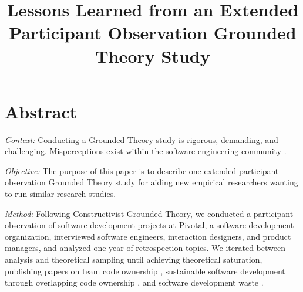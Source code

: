
\title{Lessons Learned from an Extended Participant Observation Grounded Theory Study}

\author{
\and
{}
\and
{}
}
\maketitle

\section*{Abstract}
\textit{Context:} Conducting a Grounded Theory study is rigorous, demanding, and challenging. Misperceptions exist within the software engineering community \cite{StolGroundedTheory}.

\textit{Objective:} The purpose of this paper is to describe one extended participant observation Grounded Theory study for aiding new empirical researchers wanting to run similar research studies.

\textit{Method:} Following Constructivist Grounded Theory, we conducted a \durationOfResearchStudy{} participant-observation of \numberOfObservedProjects{} software development projects at Pivotal, a software development organization, interviewed \numberOfInterviews{} software engineers, interaction designers, and product managers, and analyzed one year of retrospection topics. We iterated between analysis and theoretical sampling until achieving theoretical saturation, publishing papers on team code ownership \cite{SedanoTeamCodeOwnership}, sustainable software development through overlapping code ownership \cite{SedanoSustainableSoftware}, and software development waste \cite{SedanoSoftwareDevelopmentWaste}. 

